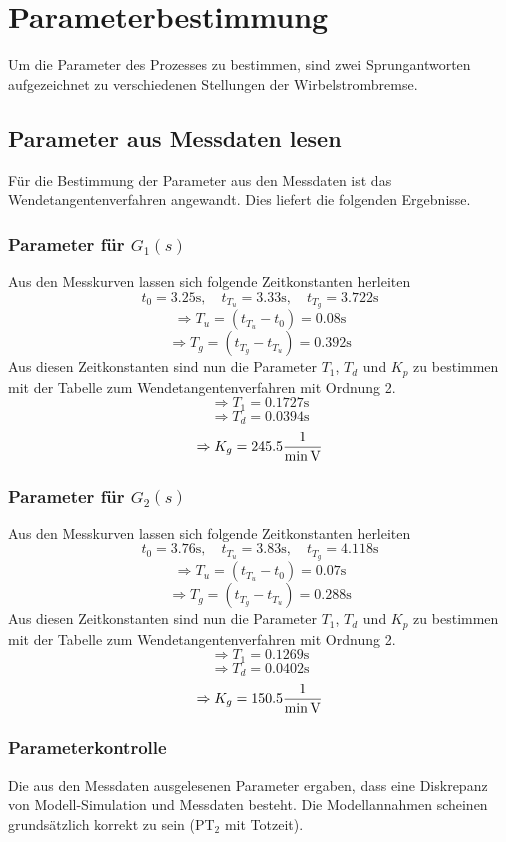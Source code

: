 \section{Parameterbestimmung}
Um die Parameter des Prozesses zu bestimmen, sind zwei Sprungantworten
aufgezeichnet zu verschiedenen Stellungen der Wirbelstrombremse.

\subsection{Parameter aus Messdaten lesen}
Für die Bestimmung der Parameter aus den Messdaten ist das
Wendetangentenverfahren angewandt. Dies liefert die folgenden 
Ergebnisse.

\subsubsection{Parameter für $G_1(s)$}
Aus den Messkurven lassen sich folgende Zeitkonstanten herleiten
\[
	t_0 = 3.25\si{\second},
	\quad t_{T_u} = 3.33\si{\second},
	\quad t_{T_g} = 3.722\si{\second}
\]
\[ \Rightarrow T_u = (t_{T_u} - t_0) = 0.08\si{\second} \]
\[ \Rightarrow T_g = (t_{T_g} - t_{T_u}) = 0.392\si{\second} \]
Aus diesen Zeitkonstanten sind nun die Parameter $T_1$, $T_d$ und $K_p$
zu bestimmen mit der Tabelle zum Wendetangentenverfahren mit Ordnung 2.
\[ \Rightarrow T_1 = 0.1727\si{\second} \]
\[ \Rightarrow T_d = 0.0394\si{\second} \]
\[ \Rightarrow K_g = 245.5\si[per-mode=fraction]{\per\minute\per\volt} \]

\subsubsection{Parameter für $G_2(s)$}
Aus den Messkurven lassen sich folgende Zeitkonstanten herleiten
\[
	t_0 = 3.76\si{\second},
	\quad t_{T_u} = 3.83\si{\second},
	\quad t_{T_g} = 4.118\si{\second}
\]
\[ \Rightarrow T_u = (t_{T_u} - t_0) = 0.07\si{\second} \]
\[ \Rightarrow T_g = (t_{T_g} - t_{T_u}) = 0.288\si{\second} \]
Aus diesen Zeitkonstanten sind nun die Parameter $T_1$, $T_d$ und $K_p$
zu bestimmen mit der Tabelle zum Wendetangentenverfahren mit Ordnung 2.
\[ \Rightarrow T_1 = 0.1269\si{\second} \]
\[ \Rightarrow T_d = 0.0402\si{\second} \]
\[ \Rightarrow K_g = 150.5\si[per-mode=fraction]{\per\minute\per\volt} \]

\subsubsection{Parameterkontrolle}
Die aus den Messdaten ausgelesenen Parameter ergaben, dass eine Diskrepanz
von Modell-Simulation und Messdaten besteht. Die Modellannahmen scheinen
grundsätzlich korrekt zu sein (PT$_2$ mit Totzeit).

